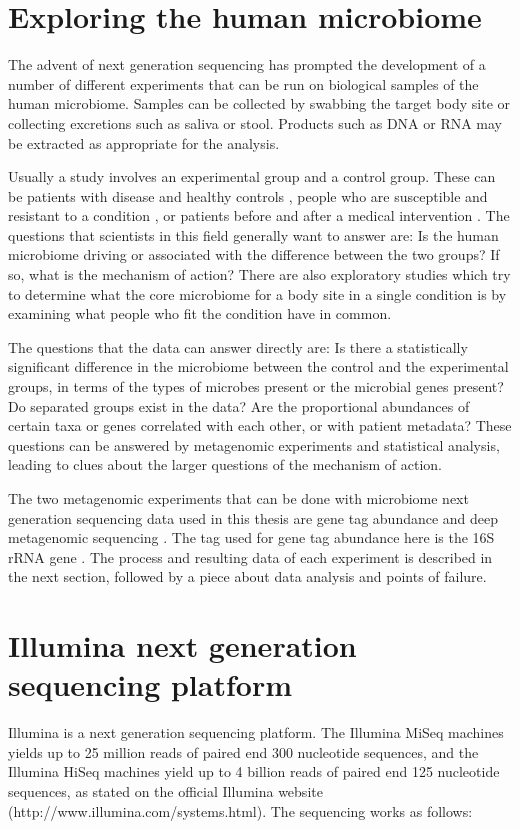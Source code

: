 \section{Exploring the human microbiome}
The advent of next generation sequencing has prompted the development of a number of different experiments that can be run on biological samples of the human microbiome. Samples can be collected by swabbing the target body site or collecting excretions such as saliva or stool. Products such as DNA or RNA may be extracted as appropriate for the analysis.

Usually a study involves an experimental group and a control group. These can be patients with disease and healthy controls \cite{macklaim2013comparative}, people who are susceptible and resistant to a condition \cite{theriot2014antibiotic}, or patients before and after a medical intervention \cite{graessler2013metagenomic}. The questions that scientists in this field generally want to answer are: Is the human microbiome driving or associated with the difference between the two groups? If so, what is the mechanism of action? There are also exploratory studies which try to determine what the core microbiome for a body site in a single condition is by examining what people who fit the condition have in common.

The questions that the data can answer directly are: Is there a statistically significant difference in the microbiome between the control and the experimental groups, in terms of the types of microbes present or the microbial genes present? Do separated groups exist in the data? Are the proportional abundances of certain taxa or genes correlated with each other, or with patient metadata? These questions can be answered by metagenomic experiments and statistical analysis, leading to clues about the larger questions of the mechanism of action.

The two metagenomic experiments that can be done with microbiome next generation sequencing data used in this thesis are gene tag abundance and deep metagenomic sequencing \cite{riesenfeld2004metagenomics}. The tag used for gene tag abundance here is the 16S rRNA gene \cite{gloor2010microbiome}. The process and resulting data of each experiment is described in the next section, followed by a piece about data analysis and points of failure.

\section{Illumina next generation sequencing platform}
Illumina is a next generation sequencing platform. The Illumina MiSeq machines yields up to 25 million reads of paired end 300 nucleotide sequences, and the Illumina HiSeq machines yield up to 4 billion reads of paired end 125 nucleotide sequences, as stated on the official Illumina website (http://www.illumina.com/systems.html). The sequencing works as follows:

